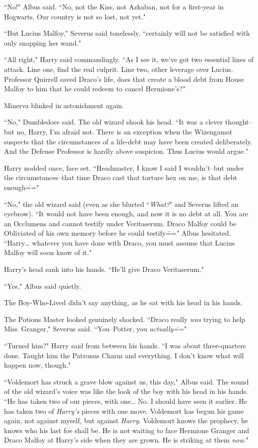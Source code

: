 ``No!" Albus said. ``No, not the Kiss, not Azkaban, not for a first-year in Hogwarts. Our country is not so lost, not yet."

``But Lucius Malfoy," Severus said tonelessly, ``certainly will not be satisfied with only snapping her wand."

``All right," Harry said commandingly. ``As I see it, we've got two essential lines of attack. Line one, find the real culprit. Line two, other leverage over Lucius. Professor Quirrell saved Draco's life, does that create a blood debt from House Malfoy to him that he could redeem to cancel Hermione's?"

Minerva blinked in astonishment again.

``No," Dumbledore said. The old wizard shook his head. ``It was a clever thought\---but no, Harry, I'm afraid not. There is an exception when the Wizengamot suspects that the circumstances of a life-debt may have been created deliberately. And the Defense Professor is hardly above suspicion. Thus Lucius would argue."

Harry nodded once, face set. ``Headmaster, I know I said I wouldn't\---but under the circumstances\---that time Draco cast that torture hex on me, is that debt enough\==="

``No," the old wizard said (even as she blurted ``\emph{What?}" and Severus lifted an eyebrow). ``It would not have been enough, and now it is no debt at all. You are an Occlumens and cannot testify under Veritaserum. Draco Malfoy could be Obliviated of his own memory before he could testify\===" Albus hesitated. ``Harry{\ldots} whatever you have done with Draco, you must assume that Lucius Malfoy will soon know of it."

Harry's head sank into his hands. ``He'll give Draco Veritaserum."

``Yes," Albus said quietly.

The Boy-Who-Lived didn't say anything, as he sat with his head in his hands.

The Potions Master looked genuinely shocked. ``Draco really \emph{was} trying to help Miss~Granger," Severus said. ``You\---Potter, you \emph{actually\===}"

``Turned him?" Harry said from between his hands. ``I was about three-quarters done. Taught him the Patronus Charm and everything. I don't know what will happen now, though."

``Voldemort has struck a grave blow against us, this day," Albus said. The sound of the old wizard's voice was like the look of the boy with his head in his hands. ``He has taken two of our pieces, with one{\ldots} No. I should have seen it earlier. He has taken two of \emph{Harry's} pieces with one move. Voldemort has begun his game again, not against myself, but against \emph{Harry}. Voldemort knows the prophecy, he knows who his last foe shall be. He is not waiting to face Hermione Granger and Draco Malfoy at Harry's side when they are grown. He is striking at them \emph{now}."

